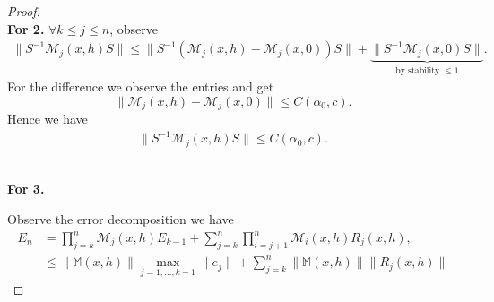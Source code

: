 \documentclass[a4paper,12pt,oneside,fleqn]{book}
\theoremstyle{definition}
\theoremstyle{remark}
\begin{document}
\begin{proof}
\qquad\\
\textbf{For 2.} $\forall k \le  j \le n$, observe
\begin{align*}
	\|S^{-1}\mathcal{M}_j(x, h) S\| \le \|S^{-1}( \mathcal{M}_j(x, h) - \mathcal{M}_j(x, 0)) S\| + \underbrace{ \|S^{-1}\mathcal{M}_j(x, 0) S\|}_{ \text{by stability }\le 1}.
\end{align*}
For the difference we observe the entries and get
\begin{equation}
	\|\mathcal{M}_j(x, h) - \mathcal{M}_j(x, 0)\| \le C(\alpha_0, c).
\end{equation}
Hence we have
\begin{align*}
	\|S^{-1}\mathcal{M}_j(x, h)S\| \le C(\alpha_0, c). 
\end{align*}

\quad\\
\textbf{For 3.}

Observe the error decomposition we have
\begin{align*}
	E_n &= \prod_{j = k}^n \mathcal{M}_j(x, h) E_{k - 1} + \sum_{j = k}^n \prod_{i = j + 1}^n \mathcal{M}_{i}(x, h) R_{j}(x, h), \\
	& \le \|\mathbb{M}(x, h)\| \max_{j = 1, \dots, k- 1} \|e_j\| + \sum^n_{j = k} \|\mathbb{M}(x, h)\| \| R_j(x, h)\|
\end{align*}
\end{proof}
\end{document}
